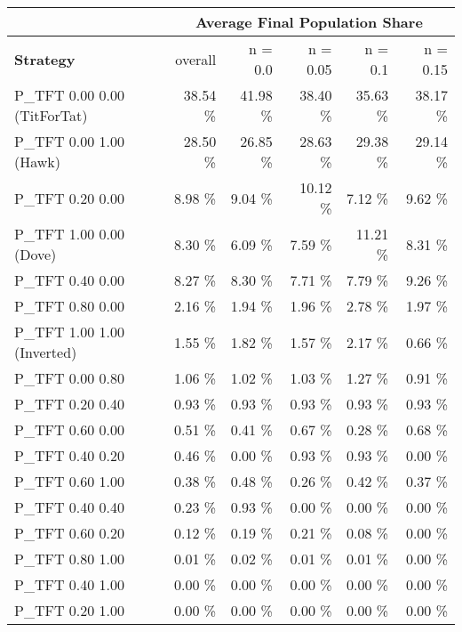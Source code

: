 \begin{tabular}{|l|r|r|r|r|r|}
\hline
 & \multicolumn{5}{c|}{{\bf Average Final Population Share}} \\
\hline
{\bf Strategy} & overall &  n = 0.0 & n = 0.05 & n = 0.1 & n = 0.15\\ \hline
P\_TFT 0.00 0.00 (TitForTat)  &   38.54 \%  &   41.98 \%  &   38.40 \%  &   35.63 \%  &   38.17 \% \\
P\_TFT 0.00 1.00 (Hawk)       &   28.50 \%  &   26.85 \%  &   28.63 \%  &   29.38 \%  &   29.14 \% \\
P\_TFT 0.20 0.00              &    8.98 \%  &    9.04 \%  &   10.12 \%  &    7.12 \%  &    9.62 \% \\
P\_TFT 1.00 0.00 (Dove)       &    8.30 \%  &    6.09 \%  &    7.59 \%  &   11.21 \%  &    8.31 \% \\
P\_TFT 0.40 0.00              &    8.27 \%  &    8.30 \%  &    7.71 \%  &    7.79 \%  &    9.26 \% \\
P\_TFT 0.80 0.00              &    2.16 \%  &    1.94 \%  &    1.96 \%  &    2.78 \%  &    1.97 \% \\
P\_TFT 1.00 1.00 (Inverted)   &    1.55 \%  &    1.82 \%  &    1.57 \%  &    2.17 \%  &    0.66 \% \\
P\_TFT 0.00 0.80              &    1.06 \%  &    1.02 \%  &    1.03 \%  &    1.27 \%  &    0.91 \% \\
P\_TFT 0.20 0.40              &    0.93 \%  &    0.93 \%  &    0.93 \%  &    0.93 \%  &    0.93 \% \\
P\_TFT 0.60 0.00              &    0.51 \%  &    0.41 \%  &    0.67 \%  &    0.28 \%  &    0.68 \% \\
P\_TFT 0.40 0.20              &    0.46 \%  &    0.00 \%  &    0.93 \%  &    0.93 \%  &    0.00 \% \\
P\_TFT 0.60 1.00              &    0.38 \%  &    0.48 \%  &    0.26 \%  &    0.42 \%  &    0.37 \% \\
P\_TFT 0.40 0.40              &    0.23 \%  &    0.93 \%  &    0.00 \%  &    0.00 \%  &    0.00 \% \\
P\_TFT 0.60 0.20              &    0.12 \%  &    0.19 \%  &    0.21 \%  &    0.08 \%  &    0.00 \% \\
P\_TFT 0.80 1.00              &    0.01 \%  &    0.02 \%  &    0.01 \%  &    0.01 \%  &    0.00 \% \\
P\_TFT 0.40 1.00              &    0.00 \%  &    0.00 \%  &    0.00 \%  &    0.00 \%  &    0.00 \% \\
P\_TFT 0.20 1.00              &    0.00 \%  &    0.00 \%  &    0.00 \%  &    0.00 \%  &    0.00 \% \\

\end{tabular}
